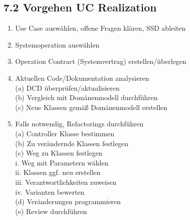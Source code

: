 \subsection*{7.2 Vorgehen UC Realization}
\begin{enumerate}
  \item Use Case auswählen, offene Fragen klären, SSD ableiten
  \item Systemoperation auswählen
  \item Operation Contract (Systemvertrag) erstellen/überlegen
  \item Aktuellen Code/Dokumentation analysieren\\
(a) DCD überprüfen/aktualisieren\\
(b) Vergleich mit Domänenmodell durchführen\\
(c) Neue Klassen gemäß Domänenmodell erstellen
  \item Falls notwendig, Refactorings durchführen\\
(a) Controller Klasse bestimmen\\
(b) Zu verändernde Klassen festlegen\\
(c) Weg zu Klassen festlegen\\
i. Weg mit Parametern wählen\\
ii. Klassen ggf. neu erstellen\\
iii. Verantwortlichkeiten zuweisen\\
iv. Varianten bewerten\\
(d) Veränderungen programmieren\\
(e) Review durchführen
\end{enumerate}